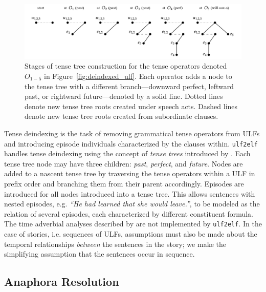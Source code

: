 \begin{figure}
    \centering
    \includegraphics[width=\columnwidth]{CH2_el/tensetrees.pdf}
    \caption{Stages of tense tree construction for the tense operators denoted $O_{1-5}$ in Figure~\ref{fig:deindexed_ulf}. Each operator adds a node to the tense tree with a different branch---downward perfect, leftward past, or rightward future---denoted by a solid line. Dotted lines denote new tense tree roots created under speech acts. Dashed lines denote new tense tree roots created from subordinate clauses.}
    \label{fig:tensetrees}
\end{figure}

Tense deindexing is the task of removing grammatical tense operators from ULFs and introducing episode individuals characterized by the clauses within. \texttt{ulf2elf} handles tense deindexing using the concept of \textit{tense trees} introduced by \citet{hwang1994ICTL}. Each tense tree node may have three children: \textit{past}, \textit{perfect}, and \textit{future}. Nodes are added to a nascent tense tree by traversing the tense operators within a ULF in prefix order and branching them from their parent accordingly. Episodes are introduced for all nodes introduced into a tense tree. This allows sentences with nested episodes, e.g. \textit{``He had learned that she would leave.''}, to be modeled as the relation of several episodes, each characterized by different constituent formula. The time adverbial analyses described by \citet{hwang1994ICTL} are not implemented by \texttt{ulf2elf}. In the case of stories, i.e. sequences of ULFs, assumptions must also be made about the temporal relationships \textit{between} the sentences in the story; we make the simplifying assumption that the sentences occur in sequence.

\subsection{Anaphora Resolution}
\label{sec:anaphora_res}

